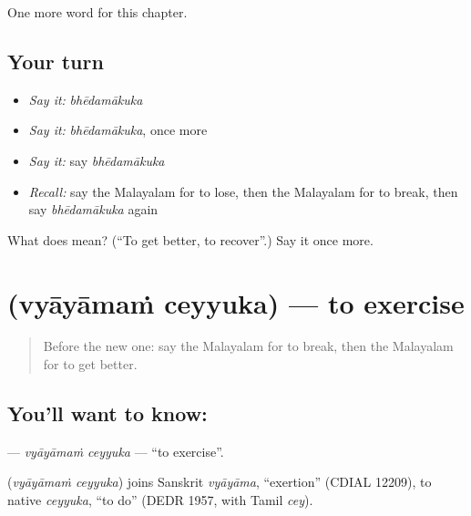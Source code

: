 \begin{grammarlens}[title={What you've built}]
One more word for this chapter.
\end{grammarlens}

\subsection*{Your turn}
\begin{itemize}
\raggedright
  \item \emph{Say it:} \emph{bhēdamākuka}
  \item \emph{Say it:} \emph{bhēdamākuka}, once more
  \item \emph{Say it:} say \emph{bhēdamākuka}
  \item \emph{Recall:} say the Malayalam for to lose, then the Malayalam for to break, then say \emph{bhēdamākuka} again
\end{itemize}

\begin{tcolorbox}[breakable,colback=teal!4,colframe=teal!35!black,title={Before you move on}]
What does  mean? (\textquotedblleft{}To get better, to recover\textquotedblright{}.) Say it once more.
\end{tcolorbox}
\section[\texorpdfstring{\ml{വ്യായാമം} \ml{ചെയ്യുക} (vyāyāmaṁ ceyyuka)}{വ്യായാമം ചെയ്യുക (vyāyāmaṁ ceyyuka)}]{  (vyāyāmaṁ ceyyuka) — to exercise}

\label{lesson:ML-C184-vyayamam-ceyyuka}



\begin{quote}
Before the new one: say the Malayalam for to break, then the Malayalam for to get better.
\end{quote}

\subsection*{You'll want to know:  }
\textbf{ } — \emph{vyāyāmaṁ ceyyuka} — \textquotedblleft{}to exercise\textquotedblright{}.

\begin{cousinweb}
\textbf{ } (\emph{vyāyāmaṁ ceyyuka}) joins Sanskrit \emph{vyāyāma}, \textquotedblleft{}exertion\textquotedblright{} (CDIAL 12209), to native \emph{ceyyuka}, \textquotedblleft{}to do\textquotedblright{} (DEDR 1957, with Tamil \emph{cey}).
\end{cousinweb}

